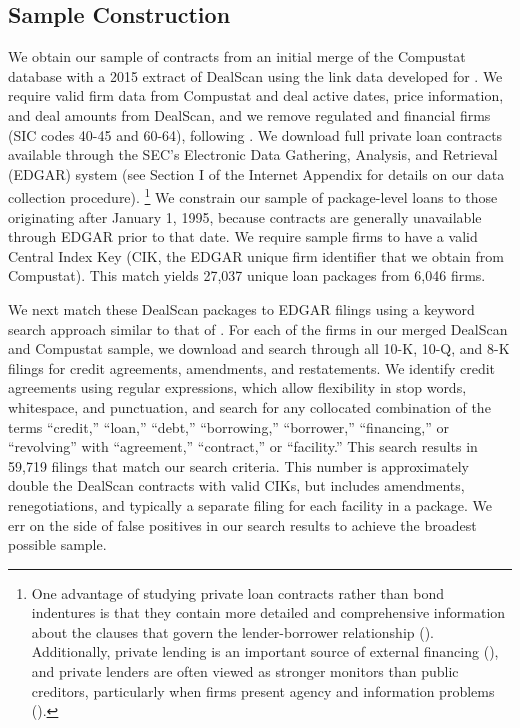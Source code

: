 \documentclass[a4paper,12pt]{article}
\begin{document}
\subsection{Sample Construction}
We obtain our sample of contracts from an initial merge of the Compustat database with a 2015 extract of DealScan using the link data developed for \citet{Chava_2008}.
We require valid firm data from Compustat and deal active dates, price information, and deal amounts from DealScan, and we remove regulated and financial firms (SIC codes 40-45 and 60-64), following \citet{Ivashina_2009}.
We download full private loan contracts available through the SEC's Electronic Data Gathering, Analysis, and Retrieval (EDGAR) system (see Section I of the Internet Appendix for details on our data collection procedure).%
	\footnote{One advantage of studying private loan contracts rather than bond indentures is that they contain more detailed and comprehensive information about the clauses that govern the lender-borrower relationship (\citet{Nini_2009}). Additionally, private lending is an important source of external financing (\citet{Sufi_2007, Roberts_2015a}), and private lenders are often viewed as stronger monitors than public creditors, particularly when firms present agency and information problems (\citet{Diamond_1984, Diamond_1991}).}
We constrain our sample of package-level loans to those originating after January 1, 1995, because contracts are generally unavailable through EDGAR prior to that date.
We require sample firms to have a valid Central Index Key (CIK, the EDGAR unique firm identifier that we obtain from Compustat).
This match yields 27,037 unique loan packages from 6,046 firms.


We next match these DealScan packages to EDGAR filings using a keyword search approach similar to that of \citet{Nini_2009}.
For each of the firms in our merged DealScan and Compustat sample, we download and search through all 10-K, 10-Q, and 8-K filings for credit agreements, amendments, and restatements.
We identify credit agreements using regular expressions, which allow flexibility in stop words, whitespace, and punctuation, and search for any collocated combination of the terms  ``credit,'' ``loan,'' ``debt,'' ``borrowing,'' ``borrower,'' ``financing,'' or ``revolving'' with ``agreement,'' ``contract,'' or ``facility.''
This search results in 59,719 filings that match our search criteria.
This number is approximately double the DealScan contracts with valid CIKs, but includes amendments, renegotiations, and typically a separate filing for each facility in a package.
We err on the side of false positives in our search results to achieve the broadest possible sample.
\end{document}
